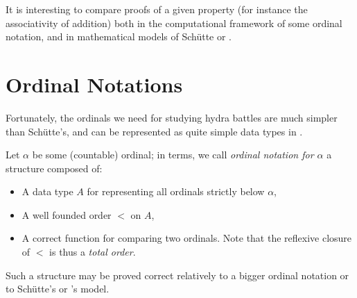 



It is interesting to compare proofs of a given property (for instance the associativity of addition) both in the computational framework of some ordinal notation, and in mathematical  models
of Schütte or \gaia.

\section{Ordinal Notations}


Fortunately, the ordinals we need for  studying hydra battles are much simpler than Schütte's, and can be represented as quite simple data types in \gallina. 

Let $\alpha$ be some (countable) ordinal; 
in \coq{} terms, we call \emph{ordinal notation for $\alpha$} a structure composed 
of:
\begin{itemize}
\item A data type $A$ for representing all ordinals strictly below $\alpha$,
\item A well founded order $<$ on $A$, 
\item A correct function for comparing two ordinals. Note  that the reflexive closure of $<$ is thus a \emph{total order}.
\end{itemize}


Such a structure may be proved correct relatively to a bigger ordinal notation or to Schütte's or \gaia's model.





